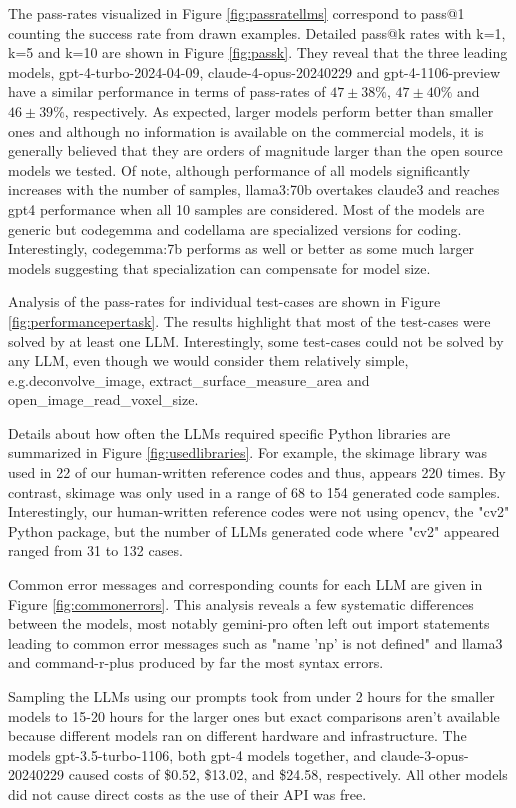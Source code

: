 \documentclass{ecai}
\begin{document}
The pass-rates visualized in Figure \ref{fig:passratellms} correspond to pass@1 counting the success rate from drawn examples. Detailed pass@k rates with k=1, k=5 and k=10 are shown in Figure \ref{fig:passk}. They reveal that the three leading models, gpt-4-turbo-2024-04-09, claude-4-opus-20240229 and gpt-4-1106-preview have a similar performance in terms of pass-rates of $47\pm38\%$, $47\pm40\%$ and $46\pm39\%$, respectively. As expected, larger models perform better than smaller ones and although no information is available on the commercial models, it is generally believed that they are orders of magnitude larger than the open source models we tested.  Of note, although performance of all models significantly increases with the number of samples, llama3:70b overtakes claude3 and reaches gpt4 performance when all 10 samples are considered. Most of the models are generic but codegemma and codellama are specialized versions for coding. Interestingly, codegemma:7b performs as well or better as some much larger models suggesting that specialization can compensate for model size.

Analysis of the pass-rates for individual test-cases are shown in Figure \ref{fig:performancepertask}. The results highlight that most of the test-cases were solved by at least one LLM. Interestingly, some test-cases could not be solved by any LLM, even though we would consider them relatively simple, e.g.deconvolve\_image, extract\_surface\_measure\_area and open\_image\_read\_voxel\_size.

Details about how often the LLMs required specific Python libraries are summarized in Figure \ref{fig:usedlibraries}. For example, the skimage library was used in 22 of our human-written reference codes and thus, appears 220 times. By contrast, skimage was only used in a range of 68 to 154 generated code samples. Interestingly, our human-written reference codes were not using opencv, the "cv2" Python package, but the number of LLMs generated code where "cv2" appeared ranged from 31 to 132 cases.

Common error messages and corresponding counts for each LLM are given in Figure \ref{fig:commonerrors}. This analysis reveals a few systematic differences between the models, most notably gemini-pro often left out import statements leading to common error messages such as "name 'np' is not defined" and llama3 and command-r-plus produced by far the most syntax errors. 

Sampling the LLMs using our prompts took from under 2 hours for the smaller models to 15-20 hours for the larger ones but exact comparisons aren't available because different models ran on different hardware and infrastructure. The models gpt-3.5-turbo-1106, both gpt-4 models together, and claude-3-opus-20240229 caused costs of \$0.52, \$13.02, and \$24.58, respectively. All other models did not cause direct costs as the use of their API was free. 
\end{document}
